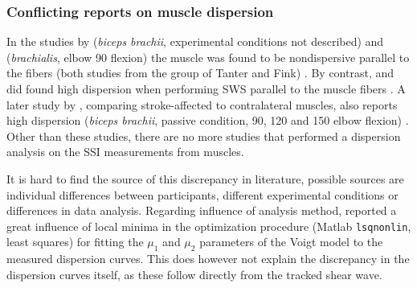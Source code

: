 \subsubsection{Conflicting reports on muscle dispersion}
In the studies by \citeauthor{deffieux_shear_2009} (\textit{biceps brachii}, experimental conditions not described) and \citeauthor{gennisson_viscoelastic_2010} (\textit{brachialis}, elbow \SI{90}{\deg} flexion) the muscle was found to be nondispersive parallel to the fibers (both studies from the group of Tanter and Fink) \cite{deffieux_shear_2009, gennisson_viscoelastic_2010}. By contrast, \citeauthor{rasool_altered_2016} and \citeauthor{saadat_frequency_2018} did found high dispersion when performing SWS parallel to the muscle fibers \cite{rasool_altered_2016, saadat_frequency_2018}. A later study by \citeauthor{rasool_shear_2018}, comparing stroke-affected to contralateral muscles, also reports high dispersion (\textit{biceps brachii}, passive condition, 90, 120 and 150 \si{\deg} elbow flexion) \cite{rasool_shear_2018}. Other than these studies, there are no more studies that performed a dispersion analysis on the SSI measurements from muscles. 

It is hard to find the source of this discrepancy in literature, possible sources are individual differences between participants, different experimental conditions or differences in data analysis. Regarding influence of analysis method, \citet{rasool_shear_2018} reported a great influence of local minima in the optimization procedure (Matlab \texttt{lsqnonlin}, least squares) for fitting the $\mu_1$ and $\mu_2$ parameters of the Voigt model to the measured dispersion curves. This does however not explain the discrepancy in the dispersion curves itself, as these follow directly from the tracked shear wave. %



